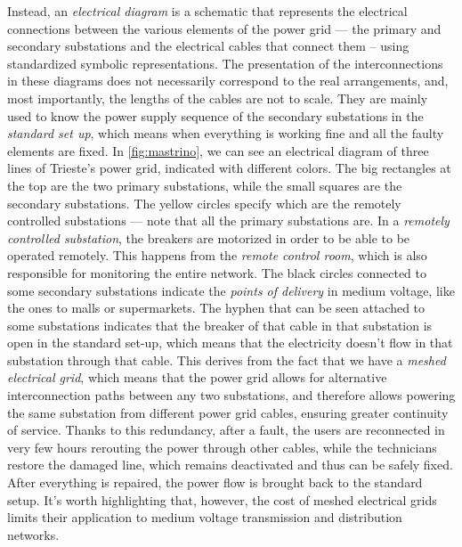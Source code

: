 Instead, an \emph{electrical diagram} is a schematic that represents the electrical connections between the various elements of the power grid --- the primary and secondary substations and the electrical cables that connect them -- using standardized symbolic representations. The presentation of the interconnections in these diagrams does not necessarily correspond to the real arrangements, and, most importantly, the lengths of the cables are not to scale. They are mainly used to know the power supply sequence of the secondary substations in the \emph{standard set up}, which means when everything is working fine and all the faulty elements are fixed. In \autoref{fig:mastrino}, we can see an electrical diagram of three lines of Trieste's power grid, indicated with different colors. The big rectangles at the top are the two primary substations, while the small squares are the secondary substations. The yellow circles specify which are the remotely controlled substations --- note that all the primary substations are. In a \emph{remotely controlled substation}, the breakers are motorized in order to be able to be operated remotely. This happens from the \emph{remote control room}, which is also responsible for monitoring the entire network. The black circles connected to some secondary substations indicate the \emph{points of delivery} in medium voltage, like the ones to malls or supermarkets. The hyphen that can be seen attached to some substations indicates that the breaker of that cable in that substation is open in the standard set-up, which means that the electricity doesn't flow in that substation through that cable. This derives from the fact that we have a \emph{meshed electrical grid}, which means that the power grid allows for alternative interconnection paths between any two substations, and therefore allows powering the same substation from different power grid cables, ensuring greater continuity of service. Thanks to this redundancy, after a fault, the users are reconnected in very few hours rerouting the power through other cables, while the technicians restore the damaged line, which remains deactivated and thus can be safely fixed. After everything is repaired, the power flow is brought back to the standard setup. It's worth highlighting that, however, the cost of meshed electrical grids limits their application to medium voltage transmission and distribution networks.


